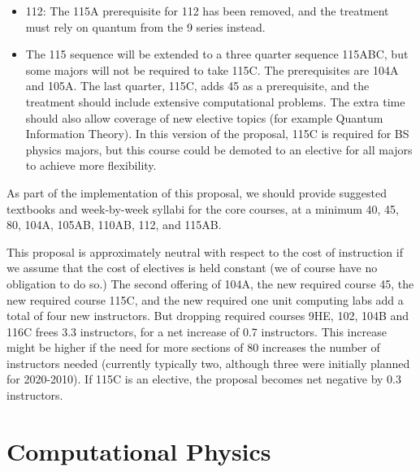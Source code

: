\documentclass[12pt]{article}
\begin{document}
\begin{itemize}
\item 112:  The 115A prerequisite for 112 has been removed, and the treatment must rely on quantum from the 9 series instead.

\item The 115 sequence will be extended to a three quarter sequence 115ABC, but some majors will not be required to take 115C.  The prerequisites are 104A and 105A.
The last quarter, 115C, adds 45 as a prerequisite, and the treatment should include extensive computational problems.  The extra time should also allow coverage of new elective topics (for example Quantum Information Theory).  In this version of the proposal, 115C is required for BS physics majors, but this course could be demoted to an elective for all majors to achieve more flexibility.

\end{itemize}

As part of the implementation of this proposal, we should provide suggested textbooks and week-by-week syllabi for the core courses, at a minimum  40, 45, 80, 104A, 105AB, 110AB, 112, and 115AB.

This proposal is approximately neutral with respect to the cost of instruction if we assume that the cost of electives is held constant (we of course have no obligation to do so.)  The second offering of 104A, the new required course 45, the new required course 115C, and the new required one unit computing labs add a total of four new instructors.  But dropping required courses 9HE, 102, 104B and 116C frees 3.3 instructors, for a net increase of 0.7 instructors.  This increase might be higher if the need for more sections of 80 increases the number of instructors needed (currently typically two, although three were initially planned for 2020-2010).  If 115C is an elective, the proposal becomes net negative by 0.3 instructors.  

\section{Computational Physics}
\end{document}

